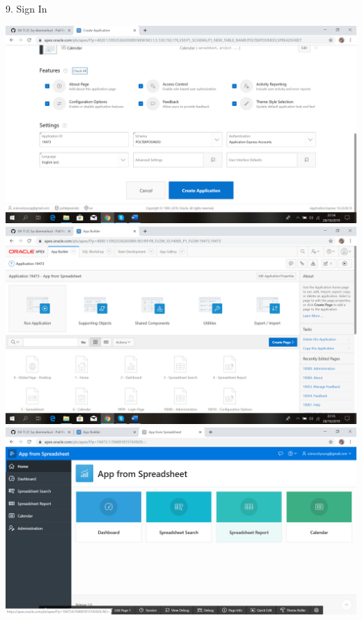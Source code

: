 \documentclass{article}
\begin{document}
\item 9. Sign In
\begin{center}
  \includegraphics[width=10cm\textwidth]{figure/13.png}
  \includegraphics[width=10cm\textwidth]{figure/14.png}
  \includegraphics[width=10cm\textwidth]{figure/15.png}
\end{center}
\end{document}

